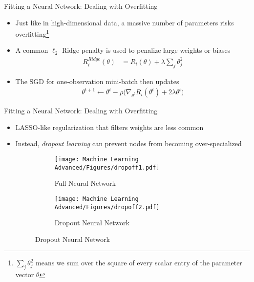\documentclass[aspectratio=1610,12pt,xcolor=dvipsnames]{beamer}
\begin{document}
\begin{frame}{Fitting a Neural Network: Dealing with Overfitting}

\begin{itemize}
    \item Just like in high-dimensional data, a massive number of parameters risks overfitting\footnote{$\sum_{j} \theta_j^2$ means we sum over the square of every scalar entry of the parameter vector $\theta$}
    \item A common $\ell_2$ Ridge penalty is used to penalize large weights or biases
      \begin{align*}
        R_i^{Ridge}(\theta) 
          &= R_i(\theta) + \lambda \sum_{j} \theta_j^2
      \end{align*}
      \item The SGD for one-observation mini-batch then updates
      \begin{align*}
          \theta^{t+1} \leftarrow \theta^t - \rho \Big( \nabla_{\theta^t} R_i(\theta^t) + 2\lambda \theta^t \Big)
      \end{align*}
\end{itemize}
\end{frame}

\begin{frame}{Fitting a Neural Network: Dealing with Overfitting}

\begin{itemize}
    \item LASSO-like regularization that filters weights are less common
    \item Instead, \textit{dropout learning} can prevent nodes from becoming over-specialized
    \begin{figure}
    \centering
  \begin{subfigure}{0.48\linewidth}
    \centering
    \texttt{[image: Machine Learning Advanced/Figures/dropoff1.pdf]} 
    \caption*{Full Neural Network}
  \end{subfigure}%
  \hspace{10pt}
  \begin{subfigure}{0.48\linewidth}
    \centering
    \texttt{[image: Machine Learning Advanced/Figures/dropoff2.pdf]} 
    \caption*{Dropout Neural Network}
  \end{subfigure}
\end{figure}
\end{itemize}
\end{frame}
\end{document}
